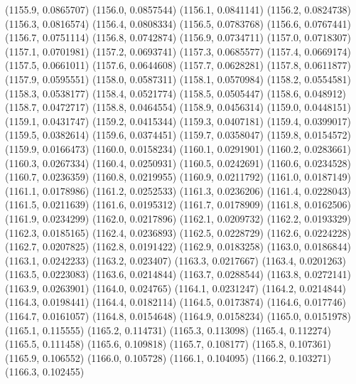 {					(1155.9, 0.0865707)
					(1156.0, 0.0857544)
					(1156.1, 0.0841141)
					(1156.2, 0.0824738)
					(1156.3, 0.0816574)
					(1156.4, 0.0808334)
					(1156.5, 0.0783768)
					(1156.6, 0.0767441)
					(1156.7, 0.0751114)
					(1156.8, 0.0742874)
					(1156.9, 0.0734711)
					(1157.0, 0.0718307)
					(1157.1, 0.0701981)
					(1157.2, 0.0693741)
					(1157.3, 0.0685577)
					(1157.4, 0.0669174)
					(1157.5, 0.0661011)
					(1157.6, 0.0644608)
					(1157.7, 0.0628281)
					(1157.8, 0.0611877)
					(1157.9, 0.0595551)
					(1158.0, 0.0587311)
					(1158.1, 0.0570984)
					(1158.2, 0.0554581)
					(1158.3, 0.0538177)
					(1158.4, 0.0521774)
					(1158.5, 0.0505447)
					(1158.6, 0.048912)
					(1158.7, 0.0472717)
					(1158.8, 0.0464554)
					(1158.9, 0.0456314)
					(1159.0, 0.0448151)
					(1159.1, 0.0431747)
					(1159.2, 0.0415344)
					(1159.3, 0.0407181)
					(1159.4, 0.0399017)
					(1159.5, 0.0382614)
					(1159.6, 0.0374451)
					(1159.7, 0.0358047)
					(1159.8, 0.0154572)
					(1159.9, 0.0166473)
					(1160.0, 0.0158234)
					(1160.1, 0.0291901)
					(1160.2, 0.0283661)
					(1160.3, 0.0267334)
					(1160.4, 0.0250931)
					(1160.5, 0.0242691)
					(1160.6, 0.0234528)
					(1160.7, 0.0236359)
					(1160.8, 0.0219955)
					(1160.9, 0.0211792)
					(1161.0, 0.0187149)
					(1161.1, 0.0178986)
					(1161.2, 0.0252533)
					(1161.3, 0.0236206)
					(1161.4, 0.0228043)
					(1161.5, 0.0211639)
					(1161.6, 0.0195312)
					(1161.7, 0.0178909)
					(1161.8, 0.0162506)
					(1161.9, 0.0234299)
					(1162.0, 0.0217896)
					(1162.1, 0.0209732)
					(1162.2, 0.0193329)
					(1162.3, 0.0185165)
					(1162.4, 0.0236893)
					(1162.5, 0.0228729)
					(1162.6, 0.0224228)
					(1162.7, 0.0207825)
					(1162.8, 0.0191422)
					(1162.9, 0.0183258)
					(1163.0, 0.0186844)
					(1163.1, 0.0242233)
					(1163.2, 0.023407)
					(1163.3, 0.0217667)
					(1163.4, 0.0201263)
					(1163.5, 0.0223083)
					(1163.6, 0.0214844)
					(1163.7, 0.0288544)
					(1163.8, 0.0272141)
					(1163.9, 0.0263901)
					(1164.0, 0.024765)
					(1164.1, 0.0231247)
					(1164.2, 0.0214844)
					(1164.3, 0.0198441)
					(1164.4, 0.0182114)
					(1164.5, 0.0173874)
					(1164.6, 0.017746)
					(1164.7, 0.0161057)
					(1164.8, 0.0154648)
					(1164.9, 0.0158234)
					(1165.0, 0.0151978)
					(1165.1, 0.115555)
					(1165.2, 0.114731)
					(1165.3, 0.113098)
					(1165.4, 0.112274)
					(1165.5, 0.111458)
					(1165.6, 0.109818)
					(1165.7, 0.108177)
					(1165.8, 0.107361)
					(1165.9, 0.106552)
					(1166.0, 0.105728)
					(1166.1, 0.104095)
					(1166.2, 0.103271)
					(1166.3, 0.102455)
}
